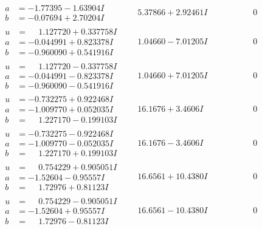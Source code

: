 \documentclass[1p]{elsarticle_modified}
\theoremstyle{definition}
\begin{document}
$$\begin{array}{c|c|c}
\begin{aligned}
a &= -1.77395 - 1.63904 I \\
b &= -0.07694 + 2.70204 I\end{aligned}
 & \phantom{-}5.37866 + 2.92461 I & \phantom{-0.000000 } 0 \\ \hline\begin{aligned}
u &= \phantom{-}1.127720 + 0.337758 I \\
a &= -0.044991 + 0.823378 I \\
b &= -0.960090 + 0.541916 I\end{aligned}
 & \phantom{-}1.04660 - 7.01205 I & \phantom{-0.000000 } 0 \\ \hline\begin{aligned}
u &= \phantom{-}1.127720 - 0.337758 I \\
a &= -0.044991 - 0.823378 I \\
b &= -0.960090 - 0.541916 I\end{aligned}
 & \phantom{-}1.04660 + 7.01205 I & \phantom{-0.000000 } 0 \\ \hline\begin{aligned}
u &= -0.732275 + 0.922468 I \\
a &= -1.009770 + 0.052035 I \\
b &= \phantom{-}1.227170 - 0.199103 I\end{aligned}
 & \phantom{-}16.1676 + 3.4606 I & \phantom{-0.000000 } 0 \\ \hline\begin{aligned}
u &= -0.732275 - 0.922468 I \\
a &= -1.009770 - 0.052035 I \\
b &= \phantom{-}1.227170 + 0.199103 I\end{aligned}
 & \phantom{-}16.1676 - 3.4606 I & \phantom{-0.000000 } 0 \\ \hline\begin{aligned}
u &= \phantom{-}0.754229 + 0.905051 I \\
a &= -1.52604 - 0.95557 I \\
b &= \phantom{-}1.72976 + 0.81123 I\end{aligned}
 & \phantom{-}16.6561 + 10.4380 I & \phantom{-0.000000 } 0 \\ \hline\begin{aligned}
u &= \phantom{-}0.754229 - 0.905051 I \\
a &= -1.52604 + 0.95557 I \\
b &= \phantom{-}1.72976 - 0.81123 I\end{aligned}
 & \phantom{-}16.6561 - 10.4380 I & \phantom{-0.000000 } 0 \\ \hline\begin{aligned}

\end{aligned}
\end{array}$$
\end{document}
